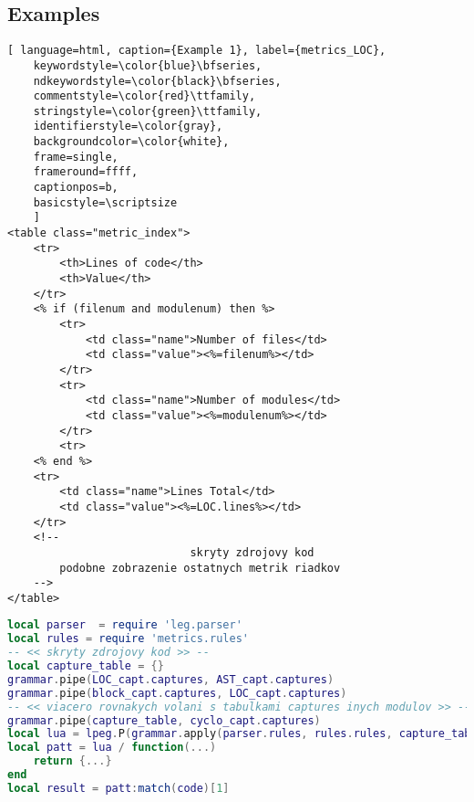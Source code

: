 \subsection{Examples}
\label{lab:Examples}

\begin{lstlisting}[ language=html, caption={Example 1}, label={metrics_LOC},
	keywordstyle=\color{blue}\bfseries,
	ndkeywordstyle=\color{black}\bfseries,
	commentstyle=\color{red}\ttfamily,
	stringstyle=\color{green}\ttfamily,
	identifierstyle=\color{gray},
	backgroundcolor=\color{white}, 
	frame=single, 
	frameround=ffff,
	captionpos=b,
	basicstyle=\scriptsize
	]
<table class="metric_index">
	<tr>
		<th>Lines of code</th>
		<th>Value</th>
	</tr>
	<% if (filenum and modulenum) then %>
		<tr>
			<td class="name">Number of files</td>
			<td class="value"><%=filenum%></td>
		</tr>
		<tr>
			<td class="name">Number of modules</td>
			<td class="value"><%=modulenum%></td>
		</tr>
		<tr>
	<% end %>
	<tr>
		<td class="name">Lines Total</td>
		<td class="value"><%=LOC.lines%></td>
	</tr>
	<!--
							skryty zdrojovy kod
		podobne zobrazenie ostatnych metrik riadkov
	-->
</table>
\end{lstlisting}

\begin{lstlisting}[language=lua, caption={Názov}, label=metrics.pipe]
local parser  = require 'leg.parser'
local rules = require 'metrics.rules'
-- << skryty zdrojovy kod >> --
local capture_table = {}
grammar.pipe(LOC_capt.captures, AST_capt.captures)
grammar.pipe(block_capt.captures, LOC_capt.captures)
-- << viacero rovnakych volani s tabulkami captures inych modulov >> --
grammar.pipe(capture_table, cyclo_capt.captures)
local lua = lpeg.P(grammar.apply(parser.rules, rules.rules, capture_table))
local patt = lua / function(...) 
	return {...} 
end
local result = patt:match(code)[1]
\end{lstlisting}

